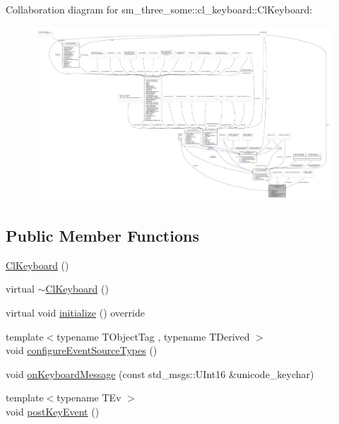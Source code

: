 Collaboration diagram for sm\+\_\+three\+\_\+some\+:\+:cl\+\_\+keyboard\+:\+:Cl\+Keyboard\+:
\nopagebreak
\begin{figure}[H]
\begin{center}
\leavevmode
\includegraphics[width=350pt]{classsm__three__some_1_1cl__keyboard_1_1ClKeyboard__coll__graph}
\end{center}
\end{figure}
\subsection*{Public Member Functions}
\begin{DoxyCompactItemize}
\item 
\hyperlink{classsm__three__some_1_1cl__keyboard_1_1ClKeyboard_a279007ab2fa1b02e15be463a8ecbf750}{Cl\+Keyboard} ()
\item 
virtual \hyperlink{classsm__three__some_1_1cl__keyboard_1_1ClKeyboard_a02b4b675bd9129729c0672242bd58d00}{$\sim$\+Cl\+Keyboard} ()
\item 
virtual void \hyperlink{classsm__three__some_1_1cl__keyboard_1_1ClKeyboard_a79b6572562326dd94e9546b492d82fbb}{initialize} () override
\item 
{\footnotesize template$<$typename T\+Object\+Tag , typename T\+Derived $>$ }\\void \hyperlink{classsm__three__some_1_1cl__keyboard_1_1ClKeyboard_a0fa5b87c64592b6864c5879961f131b9}{configure\+Event\+Source\+Types} ()
\item 
void \hyperlink{classsm__three__some_1_1cl__keyboard_1_1ClKeyboard_ac566f6a2d2b2384516ffd8517f57ecfd}{on\+Keyboard\+Message} (const std\+\_\+msgs\+::\+U\+Int16 \&unicode\+\_\+keychar)
\item 
{\footnotesize template$<$typename T\+Ev $>$ }\\void \hyperlink{classsm__three__some_1_1cl__keyboard_1_1ClKeyboard_acc062fa92e9d5e05a9690ad36cfc156e}{post\+Key\+Event} ()
\end{DoxyCompactItemize}

